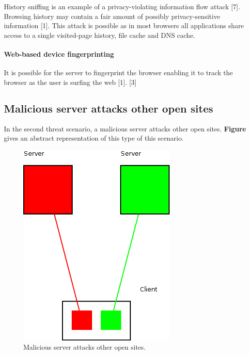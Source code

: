 History sniffing is an example of a privacy-violating information flow attack [7]. Browsing history may contain a fair amount of possibly privacy-sensitive information [1]. This attack is possible as in most browsers all applications share access to a single visited-page history, file cache and DNS cache.


\paragraph{Web-based device fingerprinting}

It is possible for the server to fingerprint the browser enabling it to track the browser as the user is surfing the web [1]. [3]



\subsection{Malicious server attacks other open sites}

In the second threat scenario, a malicious server attacks other open sites. \textbf{Figure} gives an abstract representation of this type of this scenario.

\begin{figure}
	\begin{center}		
		\includegraphics[width=0.6\columnwidth]{img/security/threat-scenario-bad-server-attacks-open-sites}
		\caption{Malicious server attacks other open sites.}
		\label{fig:threat-scenario:bad-server-attacks-open-sites}
	\end{center}
\end{figure}



